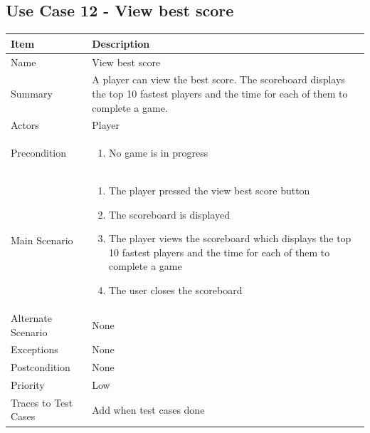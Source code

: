 \documentclass[12pt]{article}
\begin{document}
\newpage


\subsection{Use Case 12 - View best score}

\begin{center}
\setlength{\tabcolsep}{18pt}
\renewcommand{\arraystretch}{1.3}
\begin{tabular}{ |p{3.4cm}|p{10cm}| }
    \hline
   \textbf{Item} & \textbf{Description} \\
    \hline
    Name & View best score \\
    \hline
    Summary & A player can view the best score. The scoreboard displays the top 10 fastest players and the time for each of them to complete a game. \\
    \hline
    Actors & Player \\
    \hline
    Precondition & 
    \vspace*{-0.1in}
    \begin{enumerate}[leftmargin=0.2in]
     
        \item No game is in progress
        
    \end{enumerate}  \\
    \hline
    Main Scenario & 
    \vspace*{-0.1in}
    \begin{enumerate}[leftmargin=0.2in]
        \item The player pressed the view best score button
        \item The scoreboard is displayed 
        \item The player views the scoreboard which displays the top 10 fastest players and the time for each of them to complete a game
        \item The user closes the scoreboard
       
    \end{enumerate}  \\
    \hline
    Alternate Scenario & None \\
    \hline
    Exceptions & None \\
    \hline
    Postcondition & None \\
    \hline
    Priority & Low \\
    \hline
    \small{Traces to Test Cases} & Add when test cases done  \\
    \hline
\end{tabular}
\end{center}
\end{document}
